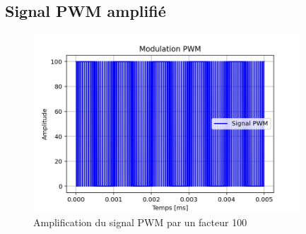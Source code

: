 \documentclass[a4paper,12pt,oneside]{report}	%
\begin{document}
        \subsection{Signal PWM amplifié}
            \begin{figure}[h!]
                \centering
                \includegraphics[width = 10cm]{code-projet-python/1.3.1 - ampl_PWM btw cos and tri.png}
                \caption{Amplification du signal PWM par un facteur 100}
                \label{fig:PWM_amp}
            \end{figure}
\newpage 
\end{document}
